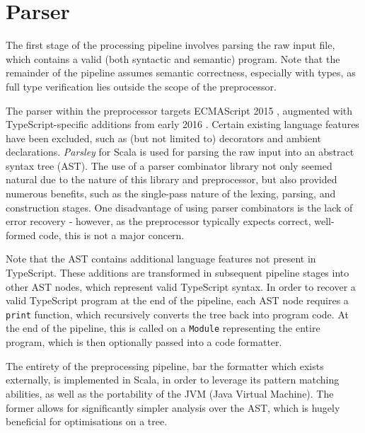 \section{\texorpdfstring{\tsext}{TypeScript<STAR>} Parser}
\label{sec:ts_parser}
The first stage of the processing pipeline involves parsing the raw input file, which contains a valid (both syntactic and semantic) \tsext program.
Note that the remainder of the pipeline assumes semantic correctness, especially with types, as full type verification lies outside the scope of the preprocessor.

The parser within the preprocessor targets ECMAScript 2015 \cite{es2015spec}, augmented with TypeScript-specific additions from early 2016 \cite{tsls}.
Certain existing language features have been excluded, such as (but not limited to) decorators and ambient declarations.
\textit{Parsley} \cite{willis18} for Scala is used for parsing the raw input into an abstract syntax tree (AST).
The use of a parser combinator library not only seemed natural due to the nature of this library and preprocessor, but also provided numerous benefits, such as the single-pass nature of the lexing, parsing, and construction stages.
One disadvantage of using parser combinators is the lack of error recovery - however, as the preprocessor typically expects correct, well-formed code, this is not a major concern.

Note that the AST contains additional language features not present in TypeScript.
These additions are transformed in subsequent pipeline stages into other AST nodes, which represent valid TypeScript syntax.
In order to recover a valid TypeScript program at the end of the pipeline, each AST node requires a \texttt{print} function, which recursively converts the tree back into program code.
At the end of the pipeline, this is called on a \texttt{Module} representing the entire program, which is then optionally passed into a code formatter.

The entirety of the preprocessing pipeline, bar the formatter which exists externally, is implemented in Scala, in order to leverage its pattern matching abilities, as well as the portability of the JVM (Java Virtual Machine).
The former allows for significantly simpler analysis over the AST, which is hugely beneficial for optimisations on a tree.
